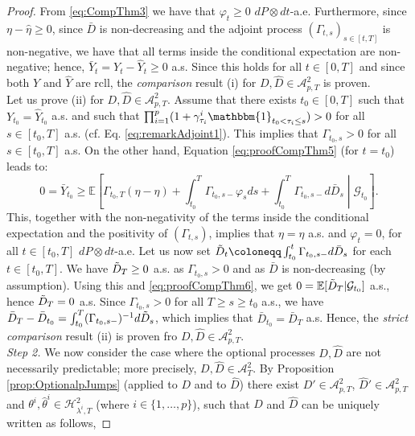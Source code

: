\documentclass[11pt,a4paper]{article}
\numberwithin{equation}{section}
\theoremstyle{newPlain}
\theoremstyle{newDefinition}
\theoremstyle{newRemark}
\begin{document}
{\begin{proof}
From \eqref{eq:CompThm3} we have that $\varphi_t\ge0$ $dP\otimes dt$-a.e. Furthermore, since $\eta-\hat{\eta}\ge0$, since $\bar{D}$ is non-decreasing and the adjoint process $(\Gamma_{t,s})_{s\in [t,T]}$ is non-negative, we have that all terms inside the conditional expectation are non-negative; hence,  $\bar{Y}_t = Y_t - \hat{Y}_t\ge0$ a.s. Since this holds for all $t\in[0,T]$ and since both $Y$ and $\hat Y$ are rcll,  the \emph{comparison} result (i) for $D,\hat{D}\in\mathcal{A}_{p,T}^2$ is proven. \\
Let us prove (ii)  for $D,\hat{D}\in\mathcal{A}_{p,T}^2$. 
Assume  that there exists  $t_0\in[0,T]$ such that $Y_{t_0}=\hat{Y}_{t_0}$ a.s. and such  that $\prod_{i=1}^p(1+\gamma_{\tau_i}^i\mathbbm{1}_{t_0<\tau_i\le s})>0$ for all $s\in[t_0,T]$ a.s. (cf. Eq. \eqref{eq:remarkAdjoint1}).  This implies that  $\Gamma_{t_0,s}>0$ for all $s\in[t_0,T]$ a.s. On the other hand, Equation  \eqref{eq:proofCompThm5} (for $t=t_0$) leads to:
\begin{equation}\label{eq:proofCompThm6}
    0 =\bar{Y}_{t_0}\ge \mathbb{E}\left[\Gamma_{t_0,T}(\eta-\hat{\eta}) + \int_{t_0}^T\Gamma_{t_0,s-}\varphi_sds+\int_{t_0}^T\Gamma_{t_0,s-}d\bar{D}_s\middle|\mathcal{G}_{t_0}\right].
\end{equation}
This, together with the non-negativity of the terms inside the conditional expectation and the positivity of $(\Gamma_{t,s})$, implies that $\eta=\hat{\eta}$ a.s. and $\varphi_t=0$, for all $t\in[t_0,T]$ $dP\otimes dt$-a.e. Let us now set $\Tilde{D}_t\coloneqq\int_{t_0}^t\Gamma_{t_0,s-}d\bar{D}_s$ for each $t\in[t_0,T]$. We have $\Tilde{D}_T\ge0$ a.s. as $\Gamma_{t_0,s}>0$ and as $\bar{D}$ is non-decreasing (by assumption). Using this and \eqref{eq:proofCompThm6}, we get $0 = \mathbb{E}[\Tilde{D}_T|\mathcal{G}_{t_0}]$ a.s., hence $\Tilde{D}_T = 0$ a.s. Since $\Gamma_{t_0,s}>0$ for all $T \ge s\ge t_0$ a.s., we have $\bar{D}_T - \bar{D}_{t_0} = \int_{t_0}^T(\Gamma_{t_0,s-})^{-1}d\Tilde{D}_s$, which implies that $\bar{D}_{t_0} = \bar{D}_T$ a.s. Hence, the \emph{strict comparison} result (ii) is proven fro $D,\hat{D}\in\mathcal{A}_{p,T}^2$.\\
\textit{Step 2.} We now consider the case where the optional processes $D,\hat{D}$ are not necessarily predictable; more precisely, $D,\hat{D}\in\mathcal{A}_T^2$.  By Proposition \ref{prop:OptionalpJumps} (applied to $D$ and to $\hat{D}$) there exist $D'\in\mathcal{A}_{p,T}^2$, $\hat{D}'\in\mathcal{A}_{p,T}^2$ and $\theta^i,\hat{\theta}^i\in\mathcal{H}_{\lambda^i,T}^2$ (where $i\in\{1,\ldots,p\}$), such that $D$ and $\hat{D}$ can be uniquely written as follows,

\end{proof}}
\end{document}
